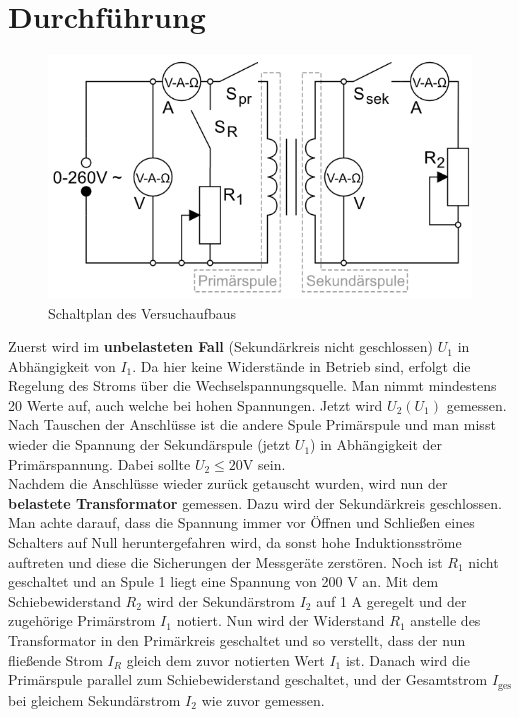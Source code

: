 \documentclass[12pt,a4paper,titlepage,headinclude,bibtotoc]{scrartcl}
\begin{document}
\section{Durchführung}
\label{sec:durchfuehrung}
\begin{figure}[!htb]
	\centering	
	\includegraphics[scale=1.0]{TrafoSchaltung.png}
	\caption{Schaltplan des Versuchaufbaus}
	\label{fig:Schaltung}
\end{figure}
Zuerst wird im \textbf{unbelasteten Fall} (Sekundärkreis nicht geschlossen) $U_1$ in Abhängigkeit von $I_1$.
Da hier keine Widerstände in Betrieb sind, erfolgt die Regelung des Stroms über die Wechselspannungsquelle.
Man nimmt mindestens 20 Werte auf, auch welche bei hohen Spannungen.
Jetzt wird $U_2(U_1)$ gemessen.
Nach Tauschen der Anschlüsse ist die andere Spule Primärspule und man misst wieder die Spannung der Sekundärspule (jetzt $U_1$) in Abhängigkeit der Primärspannung.
Dabei sollte $U_2\leq 20$V sein.\\
Nachdem die Anschlüsse wieder zurück getauscht wurden, wird nun der \textbf{belastete Transformator} gemessen.
Dazu wird der Sekundärkreis geschlossen.
Man achte darauf, dass die Spannung immer vor Öffnen und Schließen eines Schalters auf Null heruntergefahren wird, da sonst hohe Induktionsströme auftreten und diese die Sicherungen der Messgeräte zerstören.
Noch ist $R_1$ nicht geschaltet und an Spule 1 liegt eine Spannung von 200 V an.
Mit dem Schiebewiderstand $R_2$ wird der Sekundärstrom $I_2$ auf 1 A geregelt und der zugehörige Primärstrom $I_1$ notiert.
Nun wird der Widerstand $R_1$ anstelle des Transformator in den Primärkreis geschaltet und so verstellt, dass der nun fließende Strom $I_R$ gleich dem zuvor notierten Wert $I_1$ ist.
Danach wird die Primärspule parallel zum Schiebewiderstand geschaltet, und der Gesamtstrom $I_\text{ges}$ bei gleichem Sekundärstrom $I_2$ wie zuvor gemessen.
\end{document}
